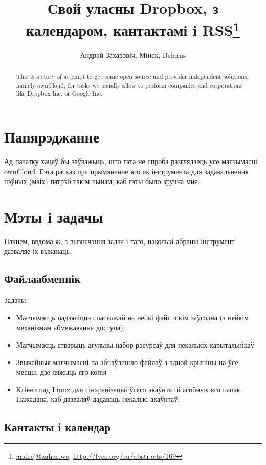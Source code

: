 \documentclass[10pt, a5paper]{article}
\begin{document}
\title{Свой уласны Dropbox, з календаром, кантактамі і RSS\footnote{\url{andrej@zahar.ws}, \url{http://lvee.org/ru/abstracts/169}}}
\author{Андрэй Захарэвіч, Мінск, Belarus}
\maketitle
\begin{abstract}
This is a story of attempt to get some open source and provider independent solutions, namely ownCloud, for tasks we usually allow to perform companies and corporations like Dropbox Inc. or Google Inc. 
\end{abstract}
\section*{Папярэджанне}

Ад пачатку хацеў бы заўважыць, што гэта не спроба разглядзець усе магчымасці ownCloud. Гэта расказ пра прымяненне яго як інструмента для задавальнення пэўных (маіх) патрэб такім чынам, каб гэты было зручна мне.

\section*{Мэты і задачы}

Пачнем, вядома ж, з вызначэння задач і таго, наколькі абраны інструмент дазваляе іх выканаць.

\subsection*{Файлаабменнік}

Задачы:

\begin{itemize}
  \item Магчымасць падзяліцца спасылкай на нейкі файл з кім заўгодна (з нейкім механізмам абмежавання доступа);
  \item Магчымасць стварыць агульны набор рэсурсаў для некалькіх карытальнікаў
  \item Звычайныя магчымасці па абнаўленню файлаў з адной крыніцы на ўсе месцы, дзе ляжыць яго копія
  \item Кліент пад Linux для сінхранізацыі ўсяго акаўнта ці асобных яго папак. Пажадана, каб дазваляў дадаваць некалькі акаўнтаў.
\end{itemize}

\subsection*{Кантакты і календар}
\end{document}
